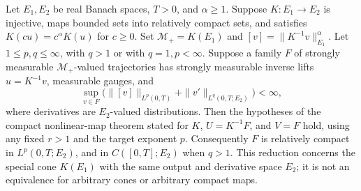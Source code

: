 Let $E_1,E_2$ be real Banach spaces, $T>0$, and $\alpha\ge1$.
Suppose $K:E_1\to E_2$ is injective, maps bounded sets into relatively compact sets, and satisfies $K(cu)=c^\alpha K(u)$ for $c\ge0$.
Set $\mathcal M_+=K(E_1)$ and $[v]=\|K^{-1}v\|_{E_1}^{\alpha}$.
Let $1\le p,q\le\infty$, with $q>1$ or with $q=1,p<\infty$.
Suppose a family $F$ of strongly measurable $\mathcal M_+$-valued trajectories has strongly measurable inverse lifts $u=K^{-1}v$, measurable gauges, and
\[
\sup_{v\in F}\bigl(\|[v]\|_{L^p(0,T)}+\|v'\|_{L^q(0,T;E_2)}\bigr)<\infty,
\]
where derivatives are $E_2$-valued distributions.
Then the hypotheses of the compact nonlinear-map theorem stated for $K$, $U=K^{-1}F$, and $V=F$ hold, using any fixed $r>1$ and the target exponent $p$.
Consequently $F$ is relatively compact in $L^p(0,T;E_2)$, and in $C([0,T];E_2)$ when $q>1$.
This reduction concerns the special cone $K(E_1)$ with the same output and derivative space $E_2$; it is not an equivalence for arbitrary cones or arbitrary compact maps.